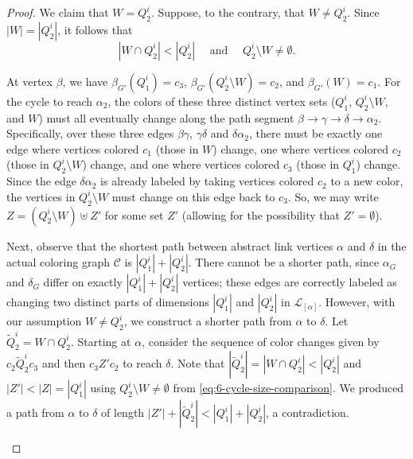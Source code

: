 \documentclass{amsart}
\theoremstyle{hypothesisstyle}
\theoremstyle{definition}
\theoremstyle{remark}
\numberwithin{equation}{section}
\newcommand{\C}{\mathcal C}
\begin{document}
\begin{proof}
We claim that $W=Q_{2}^{i}$. Suppose, to the contrary, that $W\neq Q_2^i$. Since $|W|=|Q_{2}^{i}|$, it follows that 
\begin{equation}\label{eq:6-cycle-size-comparison}
    |W\cap Q_{2}^{i}|<|Q_{2}^{i}| \quad \text{ and } \quad  Q_{2}^{i}\setminus W\neq\emptyset.
\end{equation} 

At vertex $\beta$, we have $\beta_{G'}(Q_1^i)=c_3$, $\beta_{G'}(Q_2^i\setminus W)=c_2$, and $\beta_{G'}(W)=c_1$. For the cycle to reach $\alpha_2$, the colors of these three distinct vertex sets ($Q_1^i$, $Q_2^i\setminus W$, and $W$) must all eventually change along the path segment $\beta \to \gamma \to \delta \to \alpha_2$. Specifically, over these three edges $\beta\gamma$, $\gamma\delta$ and $\delta\alpha_2$, there must be exactly one edge where vertices colored $c_1$ (those in $W$) change, one where vertices colored $c_2$ (those in $Q_2^i\setminus W$) change, and one where vertices colored $c_3$ (those in $Q_1^i$) change. Since the edge $\delta\alpha_2$ is already labeled by taking vertices colored $c_2$ to a new color, the vertices in $Q_2^i\setminus W$ must change on this edge back to $c_3$.  So, we may write $Z=(Q_2^i\setminus W)\uplus Z'$ for some set $Z'$ (allowing for the possibility that $Z'=\emptyset$).

Next, observe that the shortest path between abstract link vertices $\alpha$ and $\delta$ in the actual coloring graph $\C$ is $|Q_1^i|+|Q_2^i|$. There cannot be a shorter path, since $\alpha_G$ and $\delta_G$ differ on exactly $|Q_1^i|+|Q_2^i|$ vertices; these edges are correctly labeled as changing two distinct parts of dimensions $|Q_1^i|$ and $|Q_2^i|$ in $\mathcal{L}_{[\alpha]}$. However, with our assumption $W\neq Q_{2}^{i}$, we construct a shorter path from $\alpha$ to $\delta$. Let $\tilde{Q}_2^i=W\cap Q_2^i$.  Starting at $\alpha$, consider the sequence of color changes given by $c_2\tilde{Q}_2^ic_3$ and then $c_3 Z'c_2$ to reach $\delta$. Note that $|\tilde{Q}^{i}_2| = |W\cap Q_{2}^{i}|<|Q_{2}^{i}|$ and $|Z'|<|Z|=|Q_{1}^{i}|$ using $Q_2^{i}\setminus W\neq\emptyset$ from \eqref{eq:6-cycle-size-comparison}. We produced a path from $\alpha$ to $\delta$ of length $|Z'|+|\tilde{Q}_{2}^{i}|<|Q_{1}^{i}|+|Q_{2}^{i}|$, a contradiction. 

\begin{figure}
\centering 
\begin{tikzpicture}[remember picture, 
    vertex/.style={},
    edge_label/.style={
        sloped,    
        midway,    
        auto,      
        font=\small 
    },
    edge_style/.style={
        <->, 
        >=Latex 
    }
  ]
 

\end{tikzpicture}
\end{figure}
\end{proof}
\end{document}
